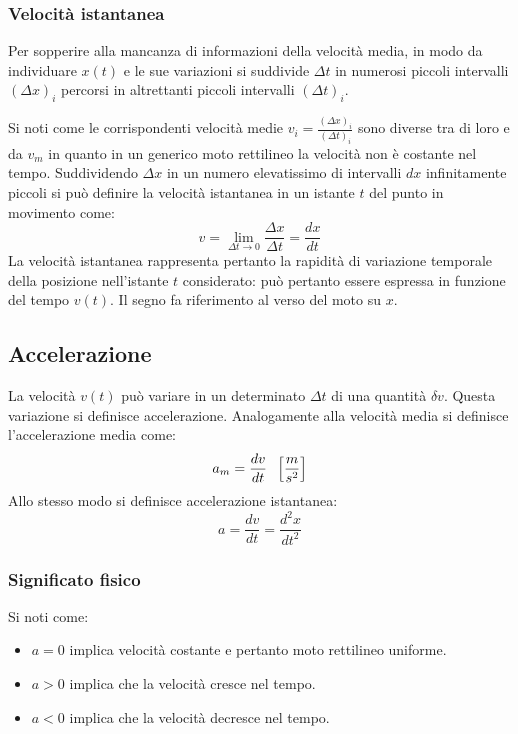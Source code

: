 \documentclass[class=book, crop=false, oneside, 12pt]{standalone}
\begin{document}
    \subsubsection{Velocit\`a istantanea}
    Per sopperire alla mancanza di informazioni della velocit\`a media, in modo da individuare \(x(t)\) e le sue variazioni si suddivide \(\Delta t\) in numerosi piccoli intervalli \((\Delta x)_i\) percorsi in altrettanti piccoli intervalli \((\Delta t)_i\).

    Si noti come le corrispondenti velocit\`a medie $v_i=\frac{(\Delta x)_i}{(\Delta t)_i}$ sono diverse tra di loro e da $v_m$ in quanto in un generico moto rettilineo la velocit\`a non \`e costante nel tempo.
    Suddividendo $\Delta x$ in un numero elevatissimo di intervalli $dx$ infinitamente piccoli si pu\`o definire la velocit\`a istantanea in un istante $t$ del punto in movimento come:
    \begin{equation}
      v=\lim\limits_{\Delta t\rightarrow 0}\dfrac{\Delta x}{\Delta t}=\dfrac{dx}{dt}
    \end{equation}
    La velocit\`a istantanea rappresenta pertanto la rapidit\`a di variazione temporale della posizione nell'istante $t$ considerato: pu\`o pertanto essere espressa in funzione del tempo $v(t)$.
    Il segno fa riferimento al verso del moto su $x$.
  \subsection{Accelerazione}
  La velocit\`a $v(t)$ pu\`o variare in un determinato $\Delta t$ di una quantit\`a $\delta v$.
  Questa variazione si definisce accelerazione.
  Analogamente alla velocit\`a media si definisce l'accelerazione media come:
  \begin{equation}
	a_m=\dfrac{dv}{dt}\hspace{0.2cm} \left[\dfrac{m}{s^2}\right]
  \end{equation}
  Allo stesso modo si definisce accelerazione istantanea:
  \begin{equation}
	a=\dfrac{dv}{dt}=\dfrac{d^2x}{dt^2}
  \end{equation}
    \subsubsection{Significato fisico}
    Si noti come:
    \begin{itemize}
      \item $a=0$ implica velocit\`a costante e pertanto moto rettilineo uniforme.
      \item $a>0$ implica che la velocit\`a cresce nel tempo.
      \item $a<0$ implica che la velocit\`a decresce nel tempo.
    \end{itemize}
\end{document}
